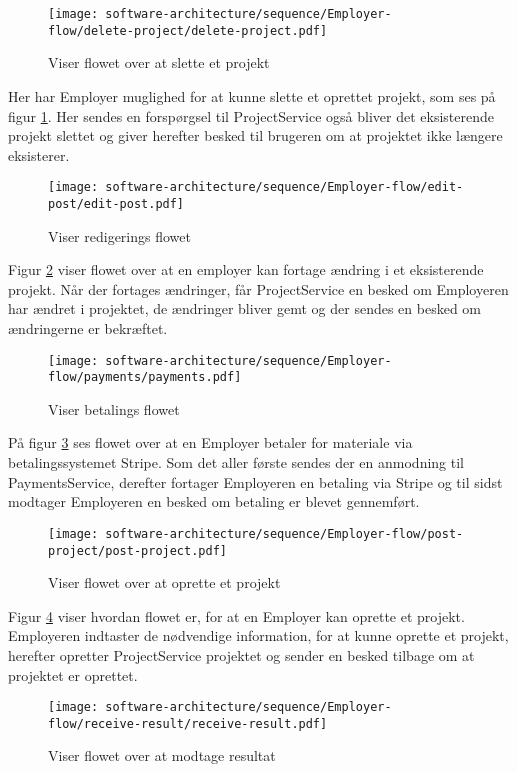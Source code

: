 \begin{figure}[H]
    \centering
\texttt{[image: software-architecture/sequence/Employer-flow/delete-project/delete-project.pdf]}
\caption{Viser flowet over at slette et projekt}
\label{fig:delete}
\end{figure}
Her har Employer muglighed for at kunne slette et oprettet projekt, som ses på figur \ref{fig:delete}. Her sendes en forspørgsel til ProjectService også bliver det eksisterende projekt slettet og giver herefter besked til brugeren om at projektet ikke længere eksisterer.

\begin{figure}[H]
    \centering
\texttt{[image: software-architecture/sequence/Employer-flow/edit-post/edit-post.pdf]}
\caption{Viser redigerings flowet}
\label{fig:edit}
\end{figure}
Figur \ref{fig:edit} viser flowet over at en employer kan fortage ændring i et eksisterende projekt. Når der fortages ændringer,
får ProjectService en besked om Employeren har ændret i projektet, de ændringer bliver gemt og der sendes en besked om ændringerne er bekræftet. 

\begin{figure}[H]
    \centering
\texttt{[image: software-architecture/sequence/Employer-flow/payments/payments.pdf]}
\caption{Viser betalings flowet}
\label{fig:payments}
\end{figure}
På figur \ref{fig:payments} ses flowet over at en Employer betaler for materiale via betalingssystemet Stripe. Som det aller første sendes der en anmodning til PaymentsService, derefter fortager Employeren en betaling via Stripe og til sidst modtager Employeren en besked om betaling er blevet gennemført.

\begin{figure}[H]
    \centering
\texttt{[image: software-architecture/sequence/Employer-flow/post-project/post-project.pdf]}
\caption{Viser flowet over at oprette et projekt}
\label{fig:projectInformation}
\end{figure}
Figur \ref{fig:projectInformation} viser hvordan flowet er, for at en Employer kan oprette et projekt. Employeren indtaster de nødvendige information, for at kunne oprette et projekt, herefter opretter ProjectService projektet og sender en besked tilbage om at projektet er oprettet. 

\begin{figure}[H]
    \centering
\texttt{[image: software-architecture/sequence/Employer-flow/receive-result/receive-result.pdf]}
\caption{Viser flowet over at modtage resultat}
\label{fig:receive}
\end{figure}

